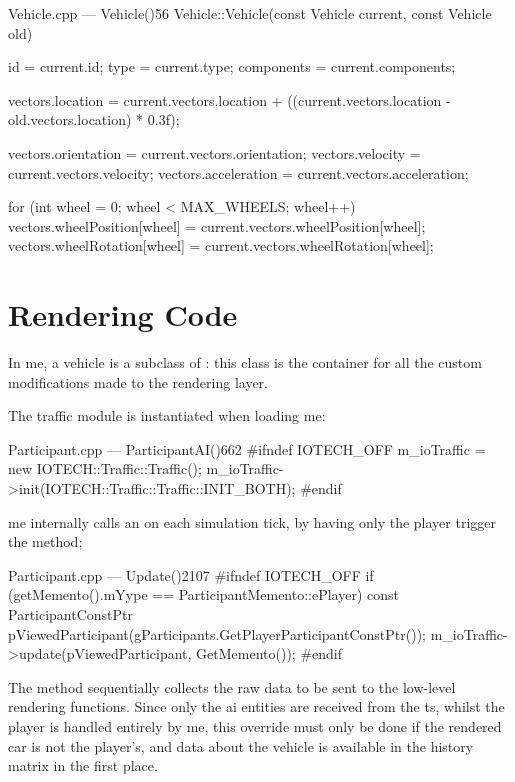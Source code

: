 \begin{codelist}{Vehicle.cpp --- Vehicle()}{56}
Vehicle::Vehicle(const Vehicle current, const Vehicle old) {
    id         = current.id;
    type       = current.type;
    components = current.components;

    vectors.location = current.vectors.location + ((current.vectors.location - old.vectors.location) * 0.3f);

    vectors.orientation  = current.vectors.orientation;
    vectors.velocity     = current.vectors.velocity;
    vectors.acceleration = current.vectors.acceleration;

    for (int wheel = 0; wheel < MAX_WHEELS; wheel++) {
        vectors.wheelPosition[wheel] = current.vectors.wheelPosition[wheel];
        vectors.wheelRotation[wheel] = current.vectors.wheelRotation[wheel];
    }
}
\end{codelist}

\section{Rendering Code}\label{sc:integration:renderingcode}

In \gls{me}, a vehicle is a subclass of : this class is the container for all the custom  modifications made to the rendering layer.

The traffic module is instantiated when loading \gls{me}:

\begin{codelist}{Participant.cpp --- ParticipantAI()}{662}
#ifndef IOTECH_OFF
	m_ioTraffic = new IOTECH::Traffic::Traffic();
	m_ioTraffic->init(IOTECH::Traffic::Traffic::INIT_BOTH);
#endif
\end{codelist}

\FLOATnoindent \gls{me} internally calls an  on each simulation tick, by having only the player  trigger the method;

\begin{codelist}{Participant.cpp --- Update()}{2107}
#ifndef IOTECH_OFF
	if (getMemento().mYype == ParticipantMemento::ePlayer) {
		const ParticipantConstPtr pViewedParticipant(gParticipants.GetPlayerParticipantConstPtr());
		m_ioTraffic->update(pViewedParticipant, GetMemento());
	}
#endif
\end{codelist}

\FLOATnoindent The  method sequentially collects the raw data to be sent to the low-level rendering functions. Since only the \gls{ai} entities are received from the \gls{ts}, whilst the player is handled entirely by \gls{me}, this override must only be done if the rendered car is not the player's, and data about the vehicle is available in the history matrix in the first place.

